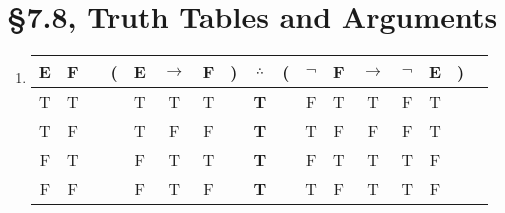 % 
% 

\section{\S 7.8, Truth Tables and Arguments}
\begin{enumerate}

	\item
	      \begin{tabular}{@{ }c@{ }@{ }c | c@{ }@{}c@{}@{ }c@{ }@{ }c@{ }@{ }c@{ }@{}c@{}@{ }c@{ }@{}c@{}@{ }c@{ }@{ }c@{ }@{ }c@{ }@{ }c@{ }@{ }c@{ }@{}c@{}@{ }c}
		      E & F &  & ( & E & $\rightarrow$ & F & ) & $\therefore $ & ( & $\lnot$ & F & $\rightarrow$ & $\lnot$ & E & ) & \\
		      \hline
		      T & T &  &   & T & T             & T &   & \textbf{T}    &   & F       & T & T             & F       & T &   & \\
		      T & F &  &   & T & F             & F &   & \textbf{T}    &   & T       & F & F             & F       & T &   & \\
		      F & T &  &   & F & T             & T &   & \textbf{T}    &   & F       & T & T             & T       & F &   & \\
		      F & F &  &   & F & T             & F &   & \textbf{T}    &   & T       & F & T             & T       & F &   & \\
	      \end{tabular}


\end{enumerate}
